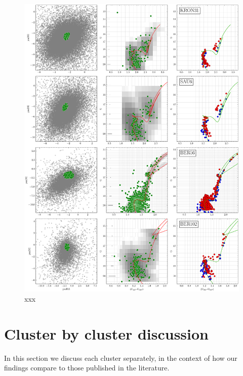 \documentclass[referee]{aa}
\begin{document}
\begin{appendix}
 \begin{figure}
  \centering
  \includegraphics[height=.95\textheight]{figs/20_fpars.png}
  \caption{xxx}
  \label{fig:20fpars}
 \end{figure}



\section{Cluster by cluster discussion}
 \label{app:indiv_clusters}

  In this section we discuss each cluster separately, in the context of how our
  findings compare to those published in the literature.\\


\end{appendix}
\end{document}

